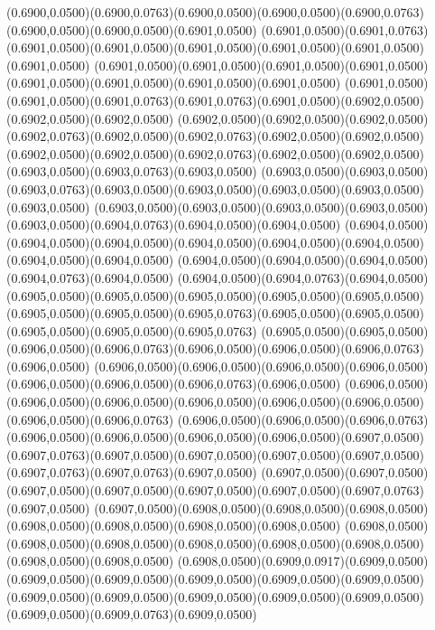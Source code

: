 (0.6900,0.0500)(0.6900,0.0763)(0.6900,0.0500)(0.6900,0.0500)(0.6900,0.0763)(0.6900,0.0500)(0.6900,0.0500)(0.6901,0.0500)
(0.6901,0.0500)(0.6901,0.0763)(0.6901,0.0500)(0.6901,0.0500)(0.6901,0.0500)(0.6901,0.0500)(0.6901,0.0500)(0.6901,0.0500)
(0.6901,0.0500)(0.6901,0.0500)(0.6901,0.0500)(0.6901,0.0500)(0.6901,0.0500)(0.6901,0.0500)(0.6901,0.0500)(0.6901,0.0500)
(0.6901,0.0500)(0.6901,0.0500)(0.6901,0.0763)(0.6901,0.0763)(0.6901,0.0500)(0.6902,0.0500)(0.6902,0.0500)(0.6902,0.0500)
(0.6902,0.0500)(0.6902,0.0500)(0.6902,0.0500)(0.6902,0.0763)(0.6902,0.0500)(0.6902,0.0763)(0.6902,0.0500)(0.6902,0.0500)
(0.6902,0.0500)(0.6902,0.0500)(0.6902,0.0763)(0.6902,0.0500)(0.6902,0.0500)(0.6903,0.0500)(0.6903,0.0763)(0.6903,0.0500)
(0.6903,0.0500)(0.6903,0.0500)(0.6903,0.0763)(0.6903,0.0500)(0.6903,0.0500)(0.6903,0.0500)(0.6903,0.0500)(0.6903,0.0500)
(0.6903,0.0500)(0.6903,0.0500)(0.6903,0.0500)(0.6903,0.0500)(0.6903,0.0500)(0.6904,0.0763)(0.6904,0.0500)(0.6904,0.0500)
(0.6904,0.0500)(0.6904,0.0500)(0.6904,0.0500)(0.6904,0.0500)(0.6904,0.0500)(0.6904,0.0500)(0.6904,0.0500)(0.6904,0.0500)
(0.6904,0.0500)(0.6904,0.0500)(0.6904,0.0500)(0.6904,0.0763)(0.6904,0.0500)
\PST@Solid(0.6904,0.0500)(0.6904,0.0763)(0.6904,0.0500)(0.6905,0.0500)(0.6905,0.0500)(0.6905,0.0500)(0.6905,0.0500)(0.6905,0.0500)
(0.6905,0.0500)(0.6905,0.0500)(0.6905,0.0763)(0.6905,0.0500)(0.6905,0.0500)(0.6905,0.0500)(0.6905,0.0500)(0.6905,0.0763)
(0.6905,0.0500)(0.6905,0.0500)(0.6906,0.0500)(0.6906,0.0763)(0.6906,0.0500)(0.6906,0.0500)(0.6906,0.0763)(0.6906,0.0500)
(0.6906,0.0500)(0.6906,0.0500)(0.6906,0.0500)(0.6906,0.0500)(0.6906,0.0500)(0.6906,0.0500)(0.6906,0.0763)(0.6906,0.0500)
(0.6906,0.0500)(0.6906,0.0500)(0.6906,0.0500)(0.6906,0.0500)(0.6906,0.0500)(0.6906,0.0500)(0.6906,0.0500)(0.6906,0.0763)
(0.6906,0.0500)(0.6906,0.0500)(0.6906,0.0763)(0.6906,0.0500)(0.6906,0.0500)(0.6906,0.0500)(0.6906,0.0500)(0.6907,0.0500)
(0.6907,0.0763)(0.6907,0.0500)(0.6907,0.0500)(0.6907,0.0500)(0.6907,0.0500)(0.6907,0.0763)(0.6907,0.0763)(0.6907,0.0500)
(0.6907,0.0500)(0.6907,0.0500)(0.6907,0.0500)(0.6907,0.0500)(0.6907,0.0500)(0.6907,0.0500)(0.6907,0.0763)(0.6907,0.0500)
(0.6907,0.0500)(0.6908,0.0500)(0.6908,0.0500)(0.6908,0.0500)(0.6908,0.0500)(0.6908,0.0500)(0.6908,0.0500)(0.6908,0.0500)
(0.6908,0.0500)(0.6908,0.0500)(0.6908,0.0500)(0.6908,0.0500)(0.6908,0.0500)(0.6908,0.0500)(0.6908,0.0500)(0.6908,0.0500)
(0.6908,0.0500)(0.6909,0.0917)(0.6909,0.0500)(0.6909,0.0500)(0.6909,0.0500)(0.6909,0.0500)(0.6909,0.0500)(0.6909,0.0500)
(0.6909,0.0500)(0.6909,0.0500)(0.6909,0.0500)(0.6909,0.0500)(0.6909,0.0500)(0.6909,0.0500)(0.6909,0.0763)(0.6909,0.0500)
